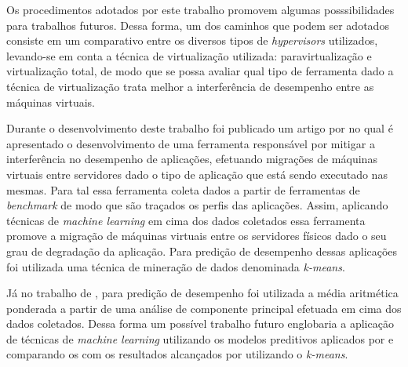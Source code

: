Os procedimentos adotados por este trabalho promovem algumas posssibilidades para trabalhos futuros. Dessa forma, um dos caminhos que podem ser adotados consiste em um comparativo entre os diversos tipos de \textit{hypervisors} utilizados, levando-se em conta a técnica de virtualização utilizada: paravirtualização e virtualização total, de modo que se possa avaliar qual tipo de ferramenta dado a técnica de virtualização trata melhor a interferência de desempenho entre as máquinas virtuais.

 Durante o desenvolvimento deste trabalho foi publicado um artigo por  no qual é apresentado o desenvolvimento de uma ferramenta responsável por mitigar a interferência no desempenho de aplicações, efetuando migrações de máquinas virtuais entre servidores dado o tipo de aplicação que está sendo executado nas mesmas. Para tal essa ferramenta coleta dados a partir de ferramentas de \textit{benchmark} de modo que são traçados os perfis das aplicações. Assim, aplicando técnicas de \textit{machine learning} em cima dos dados coletados essa ferramenta promove a migração de máquinas virtuais entre os servidores físicos dado o seu grau de degradação da aplicação. Para predição de desempenho dessas aplicações foi utilizada uma técnica de mineração de dados denominada \textit{k-means}.
 
Já no trabalho de , para predição de desempenho foi utilizada a média aritmética ponderada a partir de uma análise de componente principal efetuada em cima dos dados coletados. Dessa forma um possível trabalho futuro englobaria a aplicação de técnicas de \textit{machine learning} utilizando os modelos preditivos aplicados por  e comparando os com os resultados alcançados por  utilizando o \textit{k-means}.





\


